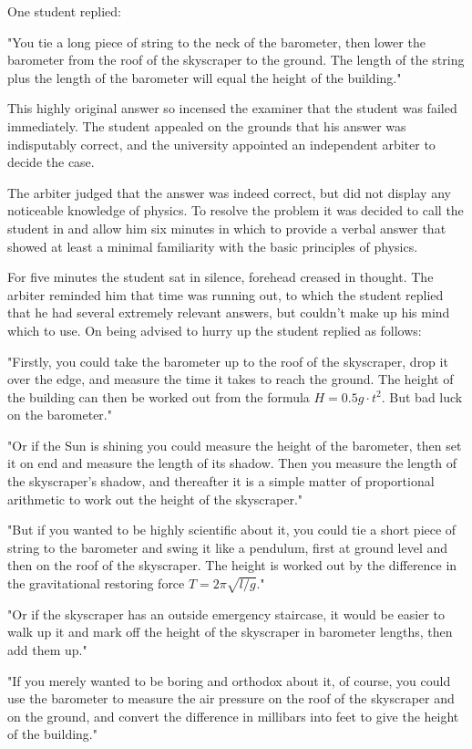 One student replied: 

"You tie a long piece of string to the neck of the barometer, then lower the barometer from the roof of the skyscraper to the ground. The length of the string plus the length of the barometer will equal the height of the building." 

This highly original answer so incensed the examiner that the student was failed immediately. The student appealed on the grounds that his answer was indisputably correct, and the university appointed an independent arbiter to decide the case. 

The arbiter judged that the answer was indeed correct, but did not display any noticeable knowledge of physics. To resolve the problem it was decided to call the student in and allow him six minutes in which to provide a verbal answer that showed at least a minimal familiarity with the basic principles of physics. 

For five minutes the student sat in silence, forehead creased in thought. The arbiter reminded him that time was running out, to which the student replied that he had several extremely relevant answers, but couldn't make up his mind which to use. On being advised to hurry up the student replied as follows: 

"Firstly, you could take the barometer up to the roof of the skyscraper, drop it over the edge, and measure the time it takes to reach the ground. The height of the building can then be worked out from the formula $H = 0.5g\cdot t^2$. But bad luck on the barometer." 

"Or if the Sun is shining you could measure the height of the barometer, then set it on end and measure the length of its shadow. Then you measure the length of the skyscraper's shadow, and thereafter it is a simple matter of proportional arithmetic to work out the height of the skyscraper." 

"But if you wanted to be highly scientific about it, you could tie a short piece of string to the barometer and swing it like a pendulum, first at ground level and then on the roof of the skyscraper. The height is worked out by the difference in the gravitational restoring force $T =2 \pi \sqrt{l /g}$." 

"Or if the skyscraper has an outside emergency staircase, it would be easier to walk up it and mark off the height of the skyscraper in barometer lengths, then add them up." 

"If you merely wanted to be boring and orthodox about it, of course, you could use the barometer to measure the air pressure on the roof of the skyscraper and on the ground, and convert the difference in millibars into feet to give the height of the building." 

